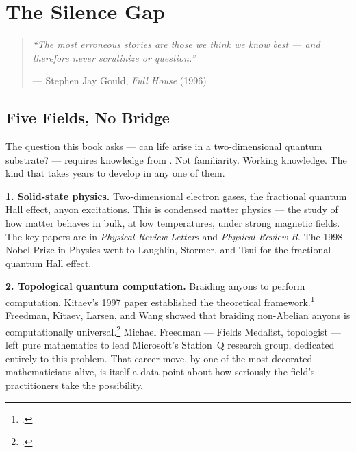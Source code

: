 
\chapter{The Silence Gap}
\label{spine:silence-gap}

\begin{quote}\small\textit{%
``The most erroneous stories are those we think we know best --- and therefore never scrutinize or question.''%
}\par\raggedleft --- Stephen Jay Gould, \textit{Full House} (1996)\end{quote}

\vspace{0.5cm}

\section*{Five Fields, No Bridge}
\label{spine:sg-five-fields-no-bridge}

The question this book asks --- can life arise in a two-dimensional quantum substrate? --- requires knowledge from . Not familiarity. Working knowledge. The kind that takes years to develop in any one of them.

\textbf{1. Solid-state physics.} Two-dimensional electron gases, the fractional quantum Hall effect, anyon excitations. This is condensed matter physics --- the study of how matter behaves in bulk, at low temperatures, under strong magnetic fields. The key papers are in \textit{Physical Review Letters} and \textit{Physical Review B}. The 1998 Nobel Prize in Physics went to Laughlin, Stormer, and Tsui for the fractional quantum Hall effect.

\textbf{2. Topological quantum computation.} Braiding anyons to perform computation. Kitaev's 1997 paper established the theoretical framework.\footcite{kitaev2003} Freedman, Kitaev, Larsen, and Wang showed that braiding non-Abelian anyons is computationally universal.\footcite{nayak2008} Michael Freedman --- Fields Medalist, topologist --- left pure mathematics to lead Microsoft's Station~Q research group, dedicated entirely to this problem. That career move, by one of the most decorated mathematicians alive, is itself a data point about how seriously the field's practitioners take the possibility.


